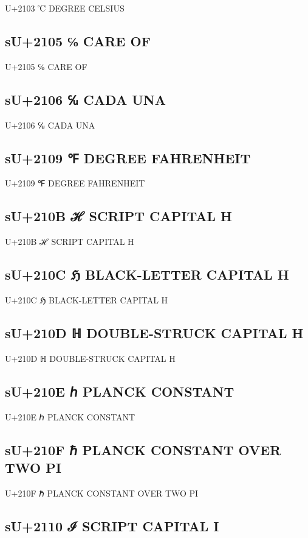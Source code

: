 U+2103 ℃  DEGREE CELSIUS

\subsection{sU+2105 ℅  CARE OF}

U+2105 ℅  CARE OF

\subsection{sU+2106 ℆  CADA UNA}

U+2106 ℆  CADA UNA

\subsection{sU+2109 ℉ DEGREE FAHRENHEIT}

U+2109 ℉ DEGREE FAHRENHEIT

\subsection{sU+210B ℋ SCRIPT CAPITAL H}

U+210B ℋ SCRIPT CAPITAL H

\subsection{sU+210C ℌ BLACK-LETTER CAPITAL H}

U+210C ℌ BLACK-LETTER CAPITAL H

\subsection{sU+210D ℍ DOUBLE-STRUCK CAPITAL H}

U+210D ℍ DOUBLE-STRUCK CAPITAL H

\subsection{sU+210E ℎ PLANCK CONSTANT}

U+210E ℎ PLANCK CONSTANT

\subsection{sU+210F ℏ PLANCK CONSTANT OVER TWO PI}

U+210F ℏ PLANCK CONSTANT OVER TWO PI

\subsection{sU+2110 ℐ SCRIPT CAPITAL I}

